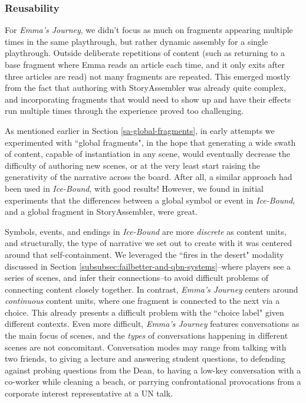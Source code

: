\subsubsection{Reusability}
\label{sa-reusability}

For \textit{Emma's Journey}, we didn't focus as much on fragments appearing multiple times in the same playthrough, but rather dynamic assembly for a single playthrough. Outside deliberate repetitions of content (such as returning to a base fragment where Emma reads an article each time, and it only exits after three articles are read) not many fragments are repeated. This emerged mostly from the fact that authoring with StoryAssembler was already quite complex, and incorporating fragments that would need to show up and have their effects run multiple times through the experience proved too challenging. 

As mentioned earlier in Section \ref{sa-global-fragments}, in early attempts we experimented with ``global fragments", in the hope that generating a wide swath of content, capable of instantiation in any scene, would eventually decrease the difficulty of authoring new scenes, or at the very least start raising the generativity of the narrative across the board. After all, a similar approach had been used in \textit{Ice-Bound}, with good results! However, we found in initial experiments that the differences between a global symbol or event in \textit{Ice-Bound}, and a global fragment in StoryAssembler, were great.

Symbols, events, and endings in \textit{Ice-Bound} are more \textit{discrete} as content units, and structurally, the type of narrative we set out to create with it was centered around that self-containment. We leveraged the ``fires in the desert" modality discussed in Section \ref{subsubsec:failbetter-and-qbn-systems}--where players see a series of scenes, and infer their connections--to avoid difficult problems of connecting content closely together. In contrast, \textit{Emma's Journey} centers around \textit{continuous} content units, where one fragment is connected to the next via a choice. This already presents a difficult problem with the ``choice label" given different contexts. Even more difficult, \textit{Emma's Journey} features conversations as the main focus of scenes, and the \textit{types} of conversations happening in different scenes are not concomitant. Conversation modes may range from talking with two friends, to giving a lecture and answering student questions, to defending against probing questions from the Dean, to having a low-key conversation with a co-worker while cleaning a beach, or parrying confrontational provocations from a corporate interest representative at a UN talk.

